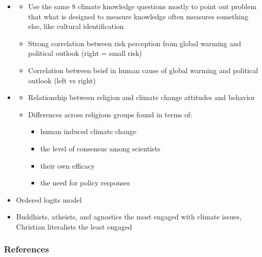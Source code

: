 \documentclass{beamer}              %
\begin{document}
 
 
\begin{frame}\label{Previous research4}
\begin{itemize}
\small


  \item \cite{Kahan2015}
\begin{itemize}
 \item Use the same 8 climate knowledge questions mostly to point out problem that what is designed to measure knowledge often measures something else, like cultural identification
 \item Strong correlation between risk perception from global warming and political outlook (right = small risk)
  \item Correlation between beief in human cause of global warming and political outlook (left vs right)
 \end{itemize}

  
 \item \cite{Morrison2015}
\begin{itemize}
 \item Relationship between religion and climate change attitudes and behavior
 \item Differences across religious groups found in terms of:
\begin{itemize} 
 \item human induced climate change
 \item the level of consensus among scientists 
  \item their own efficacy 
  \item the need for policy responses
  \end{itemize}

 \end{itemize} 
  \item Ordered logits model
   \item Buddhists, atheists, and agnostics the most engaged with climate issues, Christian literalists the least engaged
 
 

  \end{itemize}
\end{frame}










\begin{frame}
\small
\frametitle{References}



\end{frame}
\end{document}
